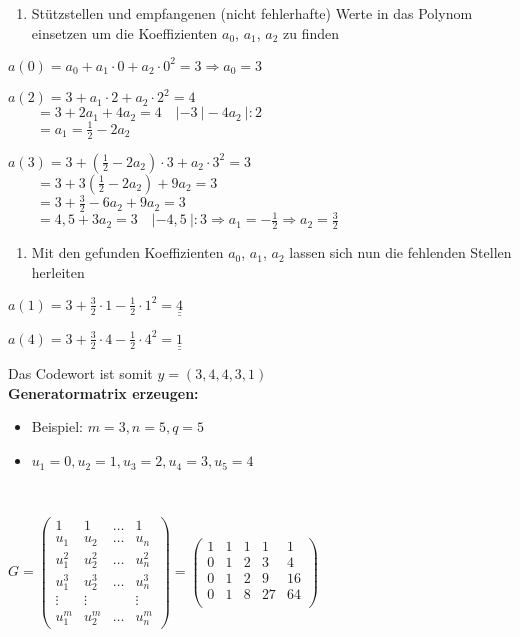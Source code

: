 \begin{enumerate}[leftmargin=*]
\item Stützstellen und empfangenen (nicht fehlerhafte) Werte in das Polynom einsetzen um die Koeffizienten $a_0$, $a_1$, $a_2$ zu finden
\end{enumerate}

$a(0) = a_0 + a_1 \cdot 0 + a_2 \cdot 0^2 = 3 \Rightarrow \boxed{a_0 = 3}$

$a(2) = 3 + a_1 \cdot 2 + a_2 \cdot 2^2 = 4$\\
$\text{}\qquad = 3 + 2a_1 + 4a_2 = 4 \quad |-3 \ | -4a_2 \ | :2$\\
$\text{}\qquad = a_1 = \frac{1}{2} - 2a_2$

$a(3) = 3 + (\frac{1}{2} - 2a_2) \cdot 3 + a_2 \cdot 3^2 = 3$\\
$\text{}\qquad = 3 + 3(\frac{1}{2} - 2a_2) + 9a_2 = 3$\\
$\text{}\qquad = 3 + \frac{3}{2} - 6a_2 + 9a_2 = 3$\\
$\text{}\qquad = 4,5 + 3a_2 = 3 \quad |-4,5 \ | :3 \Rightarrow \boxed{a_1 = -\frac{1}{2}} \Rightarrow \boxed{a_2 = \frac{3}{2}}$\\

\begin{enumerate}[leftmargin=*, label={2.}]
\item Mit den gefunden Koeffizienten $a_0$, $a_1$, $a_2$ lassen sich nun die fehlenden Stellen herleiten
\end{enumerate}

$a(1) = 3 + \frac{3}{2} \cdot 1 - \frac{1}{2} \cdot 1^2 = \underline{\underline{4}}$

$a(4) = 3 + \frac{3}{2} \cdot 4 - \frac{1}{2} \cdot 4^2 = \underline{\underline{1}}$

Das Codewort ist somit $y = (3, 4, 4, 3, 1)$\\

\textbf{Generatormatrix erzeugen:}

\begin{itemize}
\item Beispiel: $m=3, n = 5, q = 5$
\item $u_1 = 0, u_2 = 1, u_3 = 2, u_4 = 3, u_5 = 4$
\end{itemize}\

$G = \begin{pmatrix}
1        & 1      & \dots & 1\\
u_1   & u_2    & \dots & u_n\\
u_1^2  & u_2^2  & \dots & u_n^2\\
u_1^3  & u_2^3  & \dots & u_n^3\\
\vdots & \vdots &  & \vdots\\
u_1^m  & u_2^m  & \dots & u_n^m
\end{pmatrix} = \begin{pmatrix}
1 & 1 & 1 & 1 & 1\\
0 & 1 & 2 & 3 & 4\\
0 & 1 & 2 & 9 & 16\\
0 & 1 & 8 & 27 & 64\\
\end{pmatrix}$\
\\

